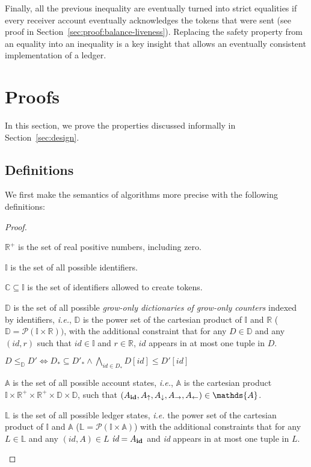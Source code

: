 \documentclass[9pt, oneside]{article}   	%
\begin{document}
Finally, all the previous inequality are eventually turned into strict equalities if every receiver account eventually acknowledges the tokens that were sent (see proof in Section~\ref{sec:proof:balance-liveness}). Replacing the safety property from an equality into an inequality is a key insight that allows an eventually consistent implementation of a ledger.

\section{Proofs}
\label{sec:proofs}

In this section, we prove the properties discussed informally in Section~\ref{sec:design}.

\subsection{Definitions}

We first make the semantics of algorithms more precise with the following definitions:
\begin{proof}
	\begin{pfenum}
		\item $\mathds{R}^+$ is the set of real positive numbers, including zero.
		\item $\mathds{I}$ is the set of all possible identifiers.
		\item $\mathds{C} \subseteq \mathds{I}$ is the set of identifiers allowed to create tokens.
		\item $\mathds{D}$ is the set of all possible \textit{grow-only dictionaries of grow-only counters} indexed by identifiers, \textit{i.e.}, $\mathds{D}$ is the power set of the cartesian product of $\mathds{I}$ and $\mathds{R}$ ($\mathds{D} = \mathcal{P}(\mathds{I} \times \mathds{R}))$, with the additional constraint that for any $D \in \mathds{D}$ and any $(\textit{id},r)$ such that $\textit{id} \in \mathds{I}$ and $r \in \mathds{R}$, $id$ appears in at most one tuple in $D$.
		\item $D \leq_\mathds{D} D' \Leftrightarrow D_* \subseteq D'_* \wedge \bigwedge\limits_{id \in D_*} D[id] \leq D'[id] $
		\item $\mathds{A}$ is the set of all possible account states, \textit{i.e.}, $\mathds{A}$ is the cartesian product $\mathds{I} \times \mathds{R}^+ \times \mathds{R}^+ \times \mathds{D} \times \mathds{D}$, such that $(A_{\footnotesize \textbf{id}}, A_\uparrow, A_\downarrow, A_\rightarrow, A_\leftarrow) \in \mathds{A}$. 
		\item $\mathds{L}$ is the set of all possible ledger states, \textit{i.e.} the power set of the cartesian product of $\mathds{I}$ and $\mathds{A}$ ($\mathds{L} = \mathcal{P}(\mathds{I} \times \mathds{A})$) with the additional constraints that for any $L \in \mathds{L}$ and any $(\textit{id}, A) \in L$ $\textit{id} = A_{\footnotesize \textbf{id}}$ and \textit{id} appears in at most one tuple in $L$.
	\end{pfenum}
\end{proof}
\end{document}
